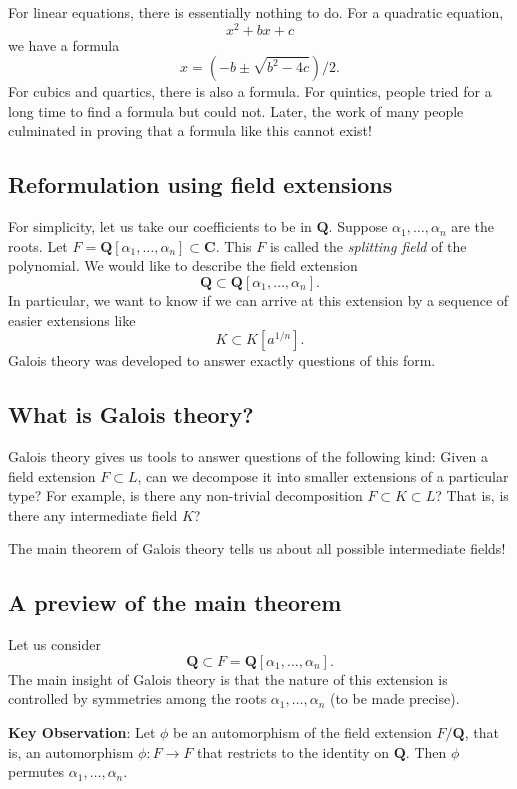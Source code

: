 \documentclass[11pt]{article}
\begin{document}
For linear equations, there is essentially nothing to do.
For a quadratic equation,
\[ x^2 + bx + c\]
we have a formula
\[ x = (-b \pm \sqrt{b^2-4c})/2.\]
For cubics and quartics, there is also a formula.
For quintics, people tried for a long time to find a formula but could not.
Later, the work of many people culminated in proving that a formula like this cannot exist!
\subsection{Reformulation using field extensions}
\label{sec:org7f04fdc}
For simplicity, let us take our coefficients to be in \(\mathbf{Q}\).
Suppose \(\alpha_1, \dots, \alpha_n\) are the roots.
Let \(F = \mathbf{Q}[\alpha_1, \dots, \alpha_n] \subset \mathbf{C}\).
This \(F\) is called the \emph{splitting field} of the polynomial.
We would like to describe the field extension
\[ \mathbf{Q} \subset \mathbf{Q}[\alpha_1, \dots, \alpha_n].\] 
In particular, we want to know if we can arrive at this extension by a sequence of easier extensions like
\[ K \subset K[a^{1/n}].\]
Galois theory was developed to answer exactly questions of this form.
\subsection{What is Galois theory?}
\label{sec:org354547e}
Galois theory gives us tools to answer questions of the following kind:
Given a field extension \(F \subset L\), can we decompose it into smaller extensions of a particular type?
For example, is there any non-trivial decomposition \(F \subset K \subset L\)?
That is, is there any intermediate field \(K\)?

The main theorem of Galois theory tells us about all possible intermediate fields!
\subsection{A preview of the main theorem}
\label{sec:org53ce709}
Let us consider
\[ \mathbf{Q} \subset F = \mathbf{Q}[\alpha_1, \dots, \alpha_{n}].\]
The main insight of Galois theory is that the nature of this extension is controlled by symmetries among the roots \(\alpha_{1}, \dots, \alpha_n\) (to be made precise).

\textbf{\textbf{Key Observation}}: Let \(\phi\) be an automorphism of the field extension \(F / \mathbf{Q}\), that is, an automorphism \(\phi \colon F \to F\) that restricts to the identity on \(\mathbf{Q}\).
Then \(\phi\) permutes \(\alpha_1, \dots, \alpha_n\).
\end{document}
